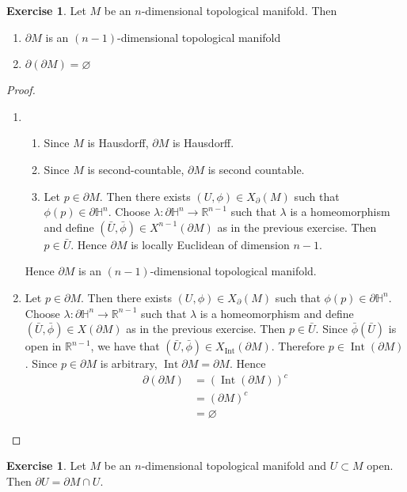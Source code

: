\documentclass{book}
\theoremstyle{definition}
\newtheorem{ex}[definition]{Exercise}
\newcommand{\lam}{\lambda}
\renewcommand{\H}{\mathbb{H}}
\newcommand{\R}{\mathbb{R}}
\DeclareMathOperator{\Int}{Int}
\DeclareMathOperator*{\0}{\mbf{0}}
\DeclareMathOperator*{\1}{\mbf{1}}
\newcommand{\p}{\partial}
\begin{document}
	\begin{ex}
		Let $M$ be an $n$-dimensional topological manifold. Then 
		\begin{enumerate}
			\item $\p M$ is an $(n-1)$-dimensional topological manifold
			\item $\p (\p M) = \varnothing$
		\end{enumerate}
	\end{ex}

	\begin{proof}\
		\begin{enumerate}
			\item 
			\begin{enumerate}
				\item Since $M$ is Hausdorff, $\p M$ is Hausdorff.
				\item Since $M$ is second-countable, $\p M$ is second countable. 
				\item Let $p \in \p M$. Then there exists $(U, \phi) \in X_{\p}(M)$ such that $\phi(p) \in \p \H^n$. Choose $\lam: \p \H^n \rightarrow \R^{n-1}$ such that $\lam$ is a homeomorphism and define $(\bar{U}, \bar{\phi}) \in X^{n-1}(\p M)$ as in the previous exercise. Then $p \in \bar{U}$. Hence $\p M$ is locally Euclidean of dimension $n-1$.
			\end{enumerate}
			Hence $\p M$ is an $(n-1)$-dimensional topological manifold.
			\item Let $p \in \p M$. Then there exists $(U, \phi) \in X_{\p}(M)$ such that $\phi(p) \in \p \H^n$. Choose $\lam: \p \H^n \rightarrow \R^{n-1}$ such that $\lam$ is a homeomorphism and define $(\bar{U}, \bar{\phi}) \in X(\p M)$ as in the previous exercise. Then $p \in \bar{U}$. Since $\bar{\phi}(\bar{U})$ is open in $\R^{n-1}$, we have that $(\bar{U}, \bar{\phi}) \in X_{\Int}(\p M)$. Therefore $p \in \Int(\p M)$. Since $p \in \p M$ is arbitrary, $\Int \p M = \p M$. Hence 
			\begin{align*}
				\p (\p M)
				& = (\Int(\p M))^c \\
				& = (\p M)^c \\
				& = \varnothing
			\end{align*} 
		\end{enumerate}
	\end{proof}

	\begin{ex}
		Let $M$ be an $n$-dimensional topological manifold and $U \subset M$ open. Then $\p U = \p M \cap U$.
	\end{ex}
\end{document}

